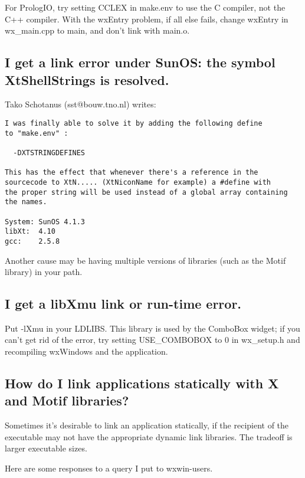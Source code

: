For PrologIO, try setting CCLEX in make.env to use the C compiler, not the C++ compiler.
With the wxEntry problem, if all else fails, change wxEntry in wx\_main.cpp to main, and
don't link with main.o.

\subsection{I get a link error under SunOS: the symbol XtShellStrings is resolved.}

Tako Schotanus (sst@bouw.tno.nl) writes:

\begin{verbatim}
I was finally able to solve it by adding the following define
to "make.env" :

  -DXTSTRINGDEFINES

This has the effect that whenever there's a reference in the
sourcecode to XtN..... (XtNiconName for example) a #define with
the proper string will be used instead of a global array containing
the names.

System: SunOS 4.1.3
libXt:  4.10
gcc:    2.5.8
\end{verbatim}

Another cause may be having multiple versions of libraries (such as the Motif library)
in your path.

\subsection{I get a libXmu link or run-time error.}

Put -lXmu in your LDLIBS. This library is used by the ComboBox widget; if you can't get rid of the error,
try setting USE\_COMBOBOX to 0 in wx\_setup.h and recompiling wxWindows and the application.

\subsection{How do I link applications statically with X and Motif libraries?}

Sometimes it's desirable to link an application statically, if the
recipient of the executable may not have the appropriate dynamic
link libraries. The tradeoff is larger executable sizes.

Here are some responses to a query I put to wxwin-users.

